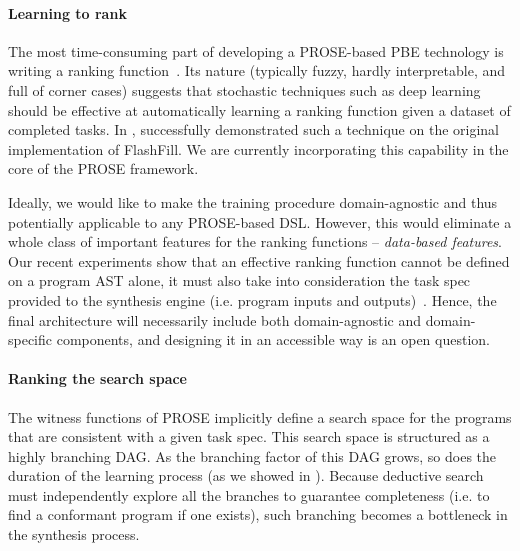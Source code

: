 \paragraph{Learning to rank}
The most time-consuming part of developing a PROSE-based PBE technology is writing a ranking
function~\cite{polozov2016program}.
Its nature (typically fuzzy, hardly interpretable, and full of corner cases) suggests that stochastic techniques such as
deep learning should be effective at automatically learning a ranking function given a dataset of completed tasks.
In \citeyear{cav:ranking}, \citet{cav:ranking} successfully demonstrated such a technique on the original implementation
of FlashFill.
We are currently incorporating this capability in the core of the PROSE framework.

Ideally, we would like to make the training procedure domain-agnostic and thus potentially applicable to any PROSE-based
DSL.
However, this would eliminate a whole class of important features for the ranking functions -- \emph{data-based
features}.
Our recent experiments show that an effective ranking function cannot be defined on a program AST alone, it must also
take into consideration the task spec provided to the synthesis engine (i.e. program inputs and
outputs)~\cite{learning2rank}.
Hence, the final architecture will necessarily include both domain-agnostic and domain-specific components, and
designing it in an accessible way is an open question.

\paragraph{Ranking the search space}
The witness functions of PROSE implicitly define a search space for the programs that are consistent with a given task
spec.
This search space is structured as a highly branching DAG.
As the branching factor of this DAG grows, so does the duration of the learning process (as we showed in
).
Because deductive search must independently explore all the branches to guarantee completeness (i.e. to find a
conformant program if one exists), such branching becomes a bottleneck in the synthesis process.

